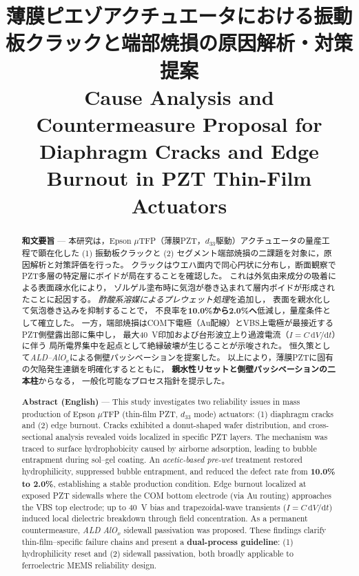 \documentclass[conference]{IEEEtran}
\title{%
  薄膜ピエゾアクチュエータにおける振動板クラックと端部焼損の原因解析・対策提案\\
  \large Cause Analysis and Countermeasure Proposal for Diaphragm Cracks and Edge Burnout in PZT Thin-Film Actuators
}
\author{%
  \IEEEauthorblockN{三溝 真一 (Shinichi Samizo)}%
  \IEEEauthorblockA{独立系半導体研究者（元セイコーエプソン） / Independent Semiconductor Researcher (ex-Seiko Epson)\\%
  Email: \href{mailto:shin3t72@gmail.com}{shin3t72@gmail.com}\quad
  GitHub: \url{https://github.com/Samizo-AITL}}%
}
\begin{document}
\maketitle

\begin{abstract}
\textbf{和文要旨} —
本研究は，Epson $\mu$TFP（薄膜PZT，$d_{33}$駆動）アクチュエータの量産工程で顕在化した
(1) 振動板クラックと (2) セグメント端部焼損の二課題を対象に，原因解析と対策評価を行った。
クラックはウエハ面内で同心円状に分布し，断面観察でPZT多層の特定層にボイドが局在することを確認した。
これは外気由来成分の吸着による表面疎水化により，
ゾルゲル塗布時に気泡が巻き込まれて層内ボイドが形成されたことに起因する。
\emph{酢酸系溶媒によるプレウェット処理}を追加し，
表面を親水化して気泡巻き込みを抑制することで，
不良率を\textbf{10.0\%から2.0\%へ}低減し，量産条件として確立した。
一方，端部焼損はCOM下電極（Au配線）とVBS上電極が最接近するPZT側壁露出部に集中し，
最大\SI{40}{V}印加および台形波立上り過渡電流（$I=C\,\mathrm{d}V/\mathrm{d}t$）に伴う
局所電界集中を起点として絶縁破壊が生じることが示唆された。
恒久策として\emph{ALD–AlO$_x$}による側壁パッシベーションを提案した。
以上により，薄膜PZTに固有の欠陥発生連鎖を明確化するとともに，
\textbf{親水性リセットと側壁パッシベーションの二本柱}からなる，
一般化可能なプロセス指針を提示した。

\medskip
\textbf{Abstract (English)} —
This study investigates two reliability issues in mass production of Epson $\mu$TFP
(thin-film PZT, $d_{33}$ mode) actuators: (1) diaphragm cracks and (2) edge burnout.
Cracks exhibited a donut-shaped wafer distribution, and cross-sectional analysis revealed
voids localized in specific PZT layers. The mechanism was traced to surface hydrophobicity
caused by airborne adsorption, leading to bubble entrapment during sol–gel coating.
An \emph{acetic-based pre-wet} treatment restored hydrophilicity,
suppressed bubble entrapment, and reduced the defect rate from \textbf{10.0\% to 2.0\%},
establishing a stable production condition.
Edge burnout localized at exposed PZT sidewalls where the COM bottom electrode
(via Au routing) approaches the VBS top electrode;
up to \SI{40}{V} bias and trapezoidal-wave transients ($I=C\,\mathrm{d}V/\mathrm{d}t$)
induced local dielectric breakdown through field concentration.
As a permanent countermeasure, \emph{ALD AlO$_x$} sidewall passivation was proposed.
These findings clarify thin-film–specific failure chains and present a
\textbf{dual-process guideline}: (1) hydrophilicity reset and (2) sidewall passivation,
both broadly applicable to ferroelectric MEMS reliability design.
\end{abstract}
\end{document}
